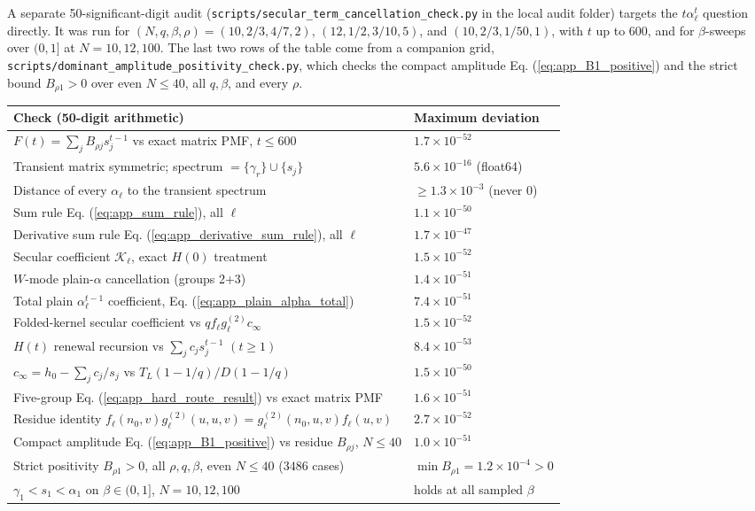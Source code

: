 \documentclass[superscriptaddress, amsmath, amssymb, aps, pre, floatfix]{revtex4-2}
\begin{document}
A separate 50-significant-digit audit
(\texttt{scripts/secular\_term\_cancellation\_check.py} in the local audit folder)
targets the \(t\alpha_\ell^t\) question directly.  It was run for
\((N,q,\beta,\rho)=(10,2/3,4/7,2)\), \((12,1/2,3/10,5)\), and \((10,2/3,1/50,1)\),
with \(t\) up to \(600\), and for \(\beta\)-sweeps over \((0,1]\) at \(N=10,12,100\).
The last two rows of the table come from a companion grid,
\texttt{scripts/dominant\_amplitude\_positivity\_check.py}, which checks the
compact amplitude Eq. (\ref{eq:app_B1_positive}) and the strict bound
\(B_{\rho1}>0\) over even \(N\le40\), all \(q,\beta\), and every \(\rho\).
\begin{center}
\small
\begin{tabular}{ll}
\hline
Check (50-digit arithmetic) & Maximum deviation \\
\hline
\(F(t)=\sum_jB_{\rho j}s_j^{t-1}\) vs exact matrix PMF, \(t\le600\) & \(1.7\times10^{-52}\) \\
Transient matrix symmetric; spectrum \(=\{\gamma_r\}\cup\{s_j\}\) & \(5.6\times10^{-16}\) (float64) \\
Distance of every \(\alpha_\ell\) to the transient spectrum & \(\geq1.3\times10^{-3}\) (never \(0\)) \\
Sum rule Eq. (\ref{eq:app_sum_rule}), all \(\ell\) & \(1.1\times10^{-50}\) \\
Derivative sum rule Eq. (\ref{eq:app_derivative_sum_rule}), all \(\ell\) & \(1.7\times10^{-47}\) \\
Secular coefficient \(\mathcal K_\ell\), exact \(H(0)\) treatment & \(1.5\times10^{-52}\) \\
\(W\)-mode plain-\(\alpha\) cancellation (groups 2+3) & \(1.4\times10^{-51}\) \\
Total plain \(\alpha_\ell^{t-1}\) coefficient, Eq. (\ref{eq:app_plain_alpha_total}) & \(7.4\times10^{-51}\) \\
Folded-kernel secular coefficient vs \(qf_\ell g^{(2)}_\ell c_\infty\) & \(1.5\times10^{-52}\) \\
\(H(t)\) renewal recursion vs \(\sum_jc_js_j^{t-1}\) \((t\ge1)\) & \(8.4\times10^{-53}\) \\
\(c_\infty=h_0-\sum_jc_j/s_j\) vs \(T_L(1-1/q)/D(1-1/q)\) & \(1.5\times10^{-50}\) \\
Five-group Eq. (\ref{eq:app_hard_route_result}) vs exact matrix PMF & \(1.6\times10^{-51}\) \\
Residue identity \(f_\ell(n_0,v)g^{(2)}_\ell(u,u,v)=g^{(2)}_\ell(n_0,u,v)f_\ell(u,v)\) & \(2.7\times10^{-52}\) \\
Compact amplitude Eq. (\ref{eq:app_B1_positive}) vs residue \(B_{\rho j}\), \(N\le40\) & \(1.0\times10^{-51}\) \\
Strict positivity \(B_{\rho1}>0\), all \(\rho,q,\beta\), even \(N\le40\) (\(3486\) cases) & \(\min B_{\rho1}=1.2\times10^{-4}>0\) \\
\(\gamma_1<s_1<\alpha_1\) on \(\beta\in(0,1]\), \(N=10,12,100\) & holds at all sampled \(\beta\) \\
\hline
\end{tabular}
\end{center}
\end{document}
